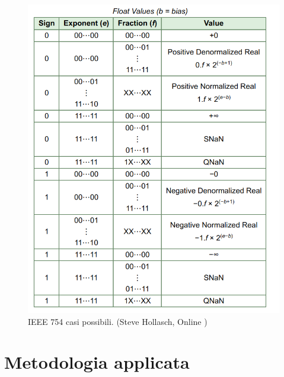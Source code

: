 \documentclass[]{IEEEtran}
\begin{document}
\begin{figure}[!htb]
    \centering
    \includegraphics[width=0.9\linewidth]{figures/codifica.png}
    \caption{IEEE 754 casi possibili. (Steve Hollasch, Online \cite{IEEE754Online})}
    \label{fig:IEEE_ENCODING}
\end{figure}



\section{Metodologia applicata}
\end{document}
